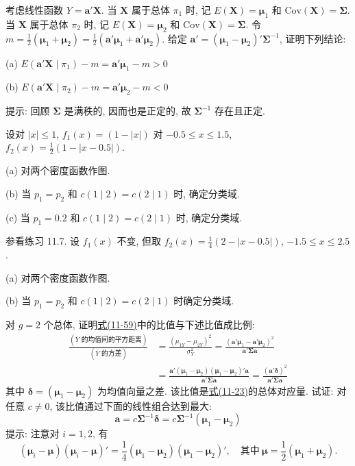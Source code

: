 
\quad 考虑线性函数 $Y=\mathbf{a}'\mathbf{X}$. 当 $\mathbf{X}$ 属于总体 $\pi_1$ 时, 记 $E(\mathbf{X})=\boldsymbol{\mu}_1$ 和 $\mathrm{Cov}(\mathbf{X})=\boldsymbol{\Sigma}$. 当 $\mathbf{X}$ 属于总体 $\pi_2$ 时, 记 $E(\mathbf{X})=\boldsymbol{\mu}_2$ 和 $\mathrm{Cov}(\mathbf{X})=\boldsymbol{\Sigma}$. 令 $m=\frac{1}{2}(\boldsymbol{\mu}_1+\boldsymbol{\mu}_2)=\frac{1}{2}(\mathbf{a}'\boldsymbol{\mu}_1+\mathbf{a}'\boldsymbol{\mu}_2)$. 给定 $\mathbf{a}'=(\boldsymbol{\mu}_1-\boldsymbol{\mu}_2)'\boldsymbol{\Sigma}^{-1}$, 证明下列结论:

(a) $E(\mathbf{a}'\mathbf{X}\mid \pi_1)-m=\mathbf{a}'\boldsymbol{\mu}_1-m>0$

(b) $E(\mathbf{a}'\mathbf{X}\mid \pi_2)-m=\mathbf{a}'\boldsymbol{\mu}_2-m<0$

提示: 回顾 $\boldsymbol{\Sigma}$ 是满秩的, 因而也是正定的, 故 $\boldsymbol{\Sigma}^{-1}$ 存在且正定.

\quad 设对 $|x|\le 1$, $f_1(x)=(1-|x|)$ 对 $-0.5\le x\le 1.5$, $f_2(x)=\frac{1}{2}(1-|x-0.5|)$.

(a) 对两个密度函数作图.

(b) 当 $p_1=p_2$ 和 $c(1\mid 2)=c(2\mid 1)$ 时, 确定分类域.

(c) 当 $p_1=0.2$ 和 $c(1\mid 2)=c(2\mid 1)$ 时, 确定分类域.

\quad 参看练习 11.7. 设 $f_1(x)$ 不变, 但取 $f_2(x)=\frac{1}{4}(2-|x-0.5|)$, $-1.5\le x\le 2.5$.

(a) 对两个密度函数作图.

(b) 当 $p_1=p_2$ 和 $c(1\mid 2)=c(2\mid 1)$ 时确定分类域.

\quad 对 $g=2$ 个总体, 证明\hyperref[eq:11-59]{式(11-59)}中的比值与下述比值成比例:
\[
\begin{aligned}
\frac{(\bar{Y}\text{ 的均值间的平方距离})}{(\bar{Y}\text{ 的方差})}&=\frac{(\mu_{1Y}-\mu_{2Y})^2}{\sigma_Y^2}=\frac{(\mathbf{a}'\boldsymbol{\mu}_1-\mathbf{a}'\boldsymbol{\mu}_2)^2}{\mathbf{a}'\boldsymbol{\Sigma}\mathbf{a}}\\
&=\frac{\mathbf{a}'(\boldsymbol{\mu}_1-\boldsymbol{\mu}_2)(\boldsymbol{\mu}_1-\boldsymbol{\mu}_2)'\mathbf{a}}{\mathbf{a}'\boldsymbol{\Sigma}\mathbf{a}}=\frac{(\mathbf{a}'\boldsymbol{\delta})^2}{\mathbf{a}'\boldsymbol{\Sigma}\mathbf{a}}
\end{aligned}
\]
其中 $\boldsymbol{\delta}=(\boldsymbol{\mu}_1-\boldsymbol{\mu}_2)$ 为均值向量之差. 该比值是\hyperref[eq:11-23]{式(11-23)}的总体对应量. 试证: 对任意 $c\ne 0$, 该比值通过下面的线性组合达到最大:
\[
\mathbf{a}=c\boldsymbol{\Sigma}^{-1}\boldsymbol{\delta}=c\boldsymbol{\Sigma}^{-1}(\boldsymbol{\mu}_1-\boldsymbol{\mu}_2)
\]
提示: 注意对 $i=1,2$, 有
\[
(\boldsymbol{\mu}_i-\boldsymbol{\mu})(\boldsymbol{\mu}_i-\boldsymbol{\mu})'=\frac{1}{4}(\boldsymbol{\mu}_1-\boldsymbol{\mu}_2)(\boldsymbol{\mu}_1-\boldsymbol{\mu}_2)',\quad \text{其中}\ \boldsymbol{\mu}=\frac{1}{2}(\boldsymbol{\mu}_1+\boldsymbol{\mu}_2).
\]

